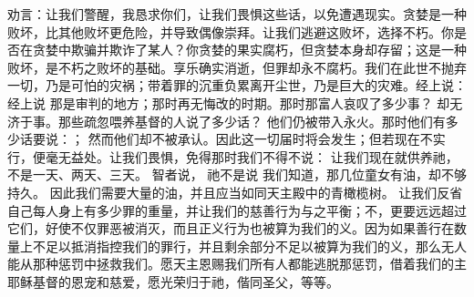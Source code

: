 劝言：让我们警醒，我恳求你们，让我们畏惧这些话，以免遭遇现实。贪婪是一种败坏，比其他败坏更危险，并导致偶像崇拜。让我们逃避这败坏，选择不朽。你是否在贪婪中欺骗并欺诈了某人？你贪婪的果实腐朽，但贪婪本身却存留；这是一种败坏，是不朽之败坏的基础。享乐确实消逝，但罪却永不腐朽。我们在此世不抛弃一切，乃是可怕的灾祸；带着罪的沉重负累离开尘世，乃是巨大的灾难。经上说： 经上说   那是审判的地方；那时再无悔改的时期。那时那富人哀叹了多少事？ 却无济于事。那些疏忽喂养基督的人说了多少话？ 他们仍被带入永火。那时他们有多少话要说：； 然而他们却不被承认。因此这一切届时将会发生；但若现在不实行，便毫无益处。让我们畏惧，免得那时我们不得不说：  让我们现在就供养祂，不是一天、两天、三天。 智者说，  祂不是说 我们知道，那几位童女有油，却不够持久。 因此我们需要大量的油，并且应当如同天主殿中的青橄榄树。 让我们反省自己每人身上有多少罪的重量，并让我们的慈善行为与之平衡；不，更要远远超过它们，好使不仅罪恶被消灭，而且正义行为也被算为我们的义。因为如果善行在数量上不足以抵消指控我们的罪行，并且剩余部分不足以被算为我们的义，那么无人能从那种惩罚中拯救我们。愿天主恩赐我们所有人都能逃脱那惩罚，借着我们的主耶稣基督的恩宠和慈爱，愿光荣归于祂，偕同圣父，等等。\par

